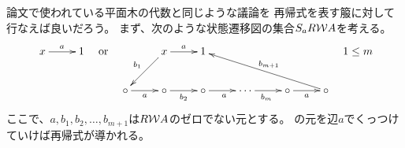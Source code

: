 	論文\cite{Connes:1998qv}で使われている平面木の代数と同じような議論を
	再帰式を表す箙に対して行なえば良いだろう。
	まず、次のような状態遷移図の集合$S_aR\mathcal{W} A$を考える。
	\begin{equation*}\begin{split} %
		\xymatrix{
			x \ar[r]^a & 1 \\
		} \quad\text{or}\quad \xymatrix{
			& x \ar[dl]_{b_1} \ar[r]^a & 1 \\
			\circ \ar[r]_a & \circ \ar[r]_{b_2} & \circ \ar[r]_a 
			& \cdots \ar[r]_{b_m} & \circ \ar[r]_a 
			& \circ \ar[ulll]_{b_{m+1}} \\
		}\quad 1\le m
	\end{split}\end{equation*} %
	ここで、$a,b_1,b_2,\dots,b_{m+1}$は$R\mathcal{W} A$のゼロでない元とする。
	の元を辺$a$でくっつけていけば再帰式が導かれる。

